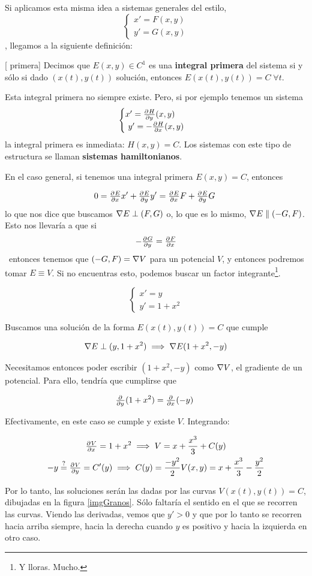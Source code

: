 Si aplicamos esta misma idea a sistemas generales del estilo, \[ \begin{cases} x' = F(x,y) \\ y' = G(x,y) \end{cases} \], llegamos a la siguiente definición:

\begin{definition}[ primera] Decimos que $E(x,y) ∈ C^1$ es una \textbf{integral primera} del sistema si y sólo si dado $(x(t),y(t))$ solución, entonces $E(x(t),y(t)) = C\;∀t$.
\end{definition} 

Esta integral primera no siempre existe. Pero, si por ejemplo tenemos un sistema \[ \begin{cases} x' = \pd{H}{y}(x,y) \\ y' = -\pd{H}{x}(x,y) \end{cases} \] la integral primera es inmediata: $H(x,y) = C$. Los sistemas con este tipo de estructura se llaman \textbf{sistemas hamiltonianos}.

En el caso general, si tenemos una integral primera $E(x,y) = C$, entonces

\[ 0 = \pd{E}{x}x' + \pd{E}{y} y' = \pd{E}{x}F + \pd{E}{y} G 
\] 
lo que nos dice que buscamos $\nabla E \perp (F,G)$ o, lo que es lo mismo, $\nabla E \parallel (-G,F)$. Esto nos llevaría a que si \[ -\pd{G}{y} = \pd{F}{x}\] entonces tenemos que $(-G,F) = \nabla V$ para un potencial $V$, y entonces podremos tomar $E\equiv V$. Si no encuentras esto, podemos buscar un factor integrante\footnote{Y lloras. Mucho.}.

\begin{example}
\[\begin{cases}x' = y \\ y' = 1+x^2 \end{cases} \]

Buscamos una solución de la forma $E(x(t), y(t)) = C$ que cumple 

\[ \nabla E \perp (y, 1+x^2) \implies \nabla E (1+x^2,-y) \]

Necesitamos entonces poder escribir $(1+x^2,-y)$ como $\nabla V$, el gradiente de un potencial. Para ello, tendría que cumplirse que 

\[ \pd{}{y}(1+x^2) = \pd{}{x}(-y) \]

Efectivamente, en este caso se cumple y existe $V$. Integrando:

\begin{gather*}
\pd{V}{x} = 1+x^2 \implies V = x + \frac{x^3}{3} + C(y) \\
-y \stackrel{?}{=} \pd{V}{y} = C'(y) \implies C(y) = \frac{-y^2}{2}
V(x,y) = x + \frac{x^3}{3} -\frac{y^2}{2}
\end{gather*}

Por lo tanto, las soluciones serán las dadas por las curvas $V(x(t), y(t)) = C$, dibujadas en la figura \ref{imgGranos}. Sólo faltaría el sentido en el que se recorren las curvas. Viendo las derivadas, vemos que $y'>0$ y que por lo tanto se recorren hacia arriba siempre, hacia la derecha cuando $y$ es positivo y hacia la izquierda en otro caso.

\end{example}

